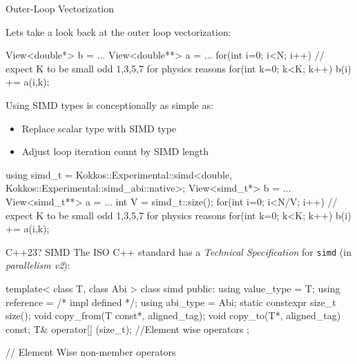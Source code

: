 \begin{frame}[fragile]{Outer-Loop Vectorization}

  Lets take a look back at the outer loop vectorization:
  \begin{code}[linebackgroundcolor={},keywords={for,int}]
  View<double*> b = ...
  View<double**> a = ...
  for(int i=0; i<N; i++) {
    // expect K to be small odd 1,3,5,7 for physics reasons
    for(int k=0; k<K; k++) b(i) += a(i,k);
  }
  \end{code}

  \pause
  Using SIMD types is conceptionally as simple as:
	\begin{itemize}
		\item Replace scalar type with SIMD type
		\item Adjust loop iteration count by SIMD length
	\end{itemize}

  \begin{code}[linebackgroundcolor={},keywords={for,int}]
  using simd_t = Kokkos::Experimental::simd<double, Kokkos::Experimental::simd_abi::native>;
  View<simd_t*> b = ...
  View<simd_t**> a = ...
  int V = simd_t::size();
  for(int i=0; i<N/V; i++) {
    // expect K to be small odd 1,3,5,7 for physics reasons
    for(int k=0; k<K; k++) b(i) += a(i,k);
  }
  \end{code}
\end{frame}

\begin{frame}[fragile]{C++23? SIMD}
	The ISO C++ standard has a \emph{Technical Specification} for \texttt{simd} (in \emph{parallelism v2}):

  \begin{code}[linebackgroundcolor={},keywords={template,class,public,using}]
template< class T, class Abi >
class simd {
public:
  using value_type = T;
  using reference = /* impl defined */;
  using abi_type = Abi;
  static constexpr size_t size();
  void copy_from(T const*, aligned_tag);
  void copy_to(T*, aligned_tag) const;
  T& operator[] (size_t);
  //Element wise operators
};

// Element Wise non-member operators

  \end{code}

\end{frame}

